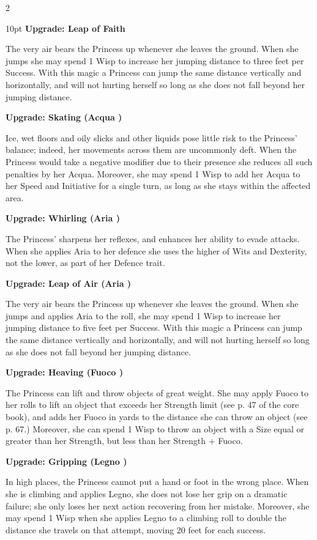\begin{multicols}{2}
\begin{myindentpar}{10pt}
\textbf{Upgrade: Leap of Faith}

The very air bears the Princess up whenever she leaves the ground. When she jumps she may spend 1 Wisp to increase her jumping distance to three feet per Success. With this magic a Princess can jump the same distance vertically and horizontally, and will not hurting herself so long as she does not fall beyond her jumping distance. 

\textbf{Upgrade: Skating (Acqua \textbullet)}

Ice, wet floors and oily slicks and other liquids pose little risk to the Princess' balance; indeed, her movements across them are uncommonly deft. When the Princess would take a negative modifier due to their presence she reduces all such penalties by her Acqua. Moreover, she may spend 1 Wisp to add her Acqua to her Speed and Initiative for a single turn, as long as she stays within the affected area.

\textbf{Upgrade: Whirling (Aria \textbullet)}

The Princess' sharpens her reflexes, and enhances her ability to evade attacks. When she applies Aria to her defence she uses the higher of Wits and Dexterity, not the lower, as part of her Defence trait. 

\textbf{Upgrade: Leap of Air (Aria \textbullet\textbullet)}

The very air bears the Princess up whenever she leaves the ground. When she jumps and applies Aria to the roll, she may spend 1 Wisp to increase her jumping distance to five feet per Success. With this magic a Princess can jump the same distance vertically and horizontally, and will not hurting herself so long as she does not fall beyond her jumping distance.  

\textbf{Upgrade: Heaving (Fuoco \textbullet\textbullet)}

The Princess can lift and throw objects of great weight. She may apply Fuoco to her rolls to lift an object that exceeds her Strength limit (see p. 47 of the core book), and adds her Fuoco in yards to the distance she can throw an object (see p. 67.) Moreover, she can spend 1 Wisp to throw an object with a Size equal or greater than her Strength, but less than her Strength + Fuoco.

\textbf{Upgrade: Gripping (Legno \textbullet\textbullet)}

In high places, the Princess cannot put a hand or foot in the wrong place. When she is climbing and applies Legno, she does not lose her grip on a dramatic failure; she only loses her next action recovering from her mistake. Moreover, she may spend 1 Wisp when she applies Legno to a climbing roll to double the distance she travels on that attempt, moving 20 feet for each success.\end{myindentpar}


\end{multicols}
